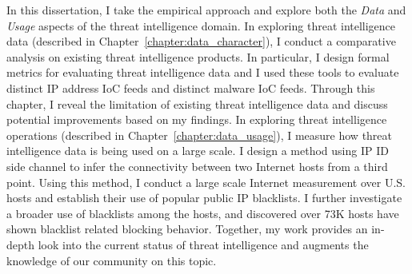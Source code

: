 In this dissertation, I take the empirical approach and explore both the 
\textit{Data} and \textit{Usage} aspects of the threat intelligence
domain. In exploring threat intelligence data (described in
Chapter~\ref{chapter:data_character}), I conduct a comparative analysis on
existing threat intelligence products. In particular, I design formal 
metrics for evaluating threat intelligence data and I used these tools to 
evaluate {\numipfeeds} distinct IP address IoC feeds and {\numhashfeeds}
distinct malware IoC feeds. Through this chapter, I reveal the limitation of
existing threat intelligence data and discuss potential improvements 
based on my findings. In exploring threat intelligence operations 
(described in Chapter~\ref{chapter:data_usage}),
I measure how threat intelligence data is being used on a large scale. 
I design a method using IP ID side channel to infer the connectivity 
between two Internet hosts from a third point. Using this 
method, I conduct a large scale Internet measurement over {} 
U.S. hosts and establish their use of {\blacklistnum} popular public IP
blacklists. I further investigate a broader use of blacklists among the 
hosts, and discovered over 73K hosts have shown blacklist related blocking 
behavior. Together, my work provides an in-depth look into the current
status of threat intelligence and augments the knowledge of our community
on this topic.

